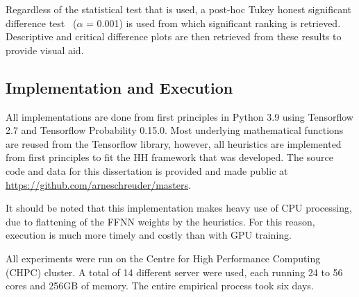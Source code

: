 Regardless of the statistical test that is used, a post-hoc Tukey honest significant difference test~\cite{ref:tukey:1949} ($\alpha$ = 0.001) is used from which significant ranking is retrieved. Descriptive and critical difference plots are then retrieved from these results to provide visual aid.

\subsection{Implementation and Execution}\label{sec:methodology:implementation}

All implementations are done from first principles in Python 3.9 using Tensorflow 2.7 and Tensorflow Probability 0.15.0. Most underlying mathematical functions are reused from the Tensorflow library, however, all heuristics are implemented from first principles to fit the \acs{HH} framework that was developed. The source code and data for this dissertation is provided and made public at \url{https://github.com/arneschreuder/masters}.

It should be noted that this implementation makes heavy use of CPU processing, due to flattening of the \acs{FFNN} weights by the heuristics. For this reason, execution is much more timely and costly than with GPU training.

All experiments were run on the Centre for High Performance Computing (CHPC) cluster. A total of 14 different server were used, each running 24 to 56 cores and 256GB of memory. The entire empirical process took six days.
